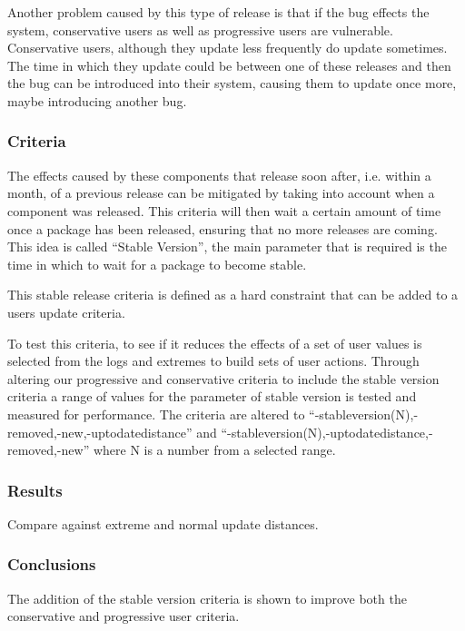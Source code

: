 Another problem caused by this type of release is that if the bug effects the system, conservative users as well as progressive users are vulnerable.
Conservative users, although they update less frequently do update sometimes.
The time in which they update could be between one of these releases and then the bug can be introduced into their system, 
causing them to update once more, maybe introducing another bug.


\subsubsection{Criteria}   
The effects caused by these components that release soon after, i.e. within a month, of a previous release can be mitigated by taking into account when a component was released.
This criteria will then wait a certain amount of time once a package has been released, ensuring that no more releases are coming.
This idea is called ``Stable Version'', the main parameter that is required is the time in which to wait for a package to become stable.

This stable release criteria is defined as a hard constraint that can be added to a users update criteria.

To test this criteria, to see if it reduces the effects of a set of user values is selected from the logs and extremes to build sets of user actions.
Through altering our progressive and conservative criteria to include the stable version criteria a range of values for the parameter of stable version is tested and measured for performance.
The criteria are altered to ``-stableversion(N),-removed,-new,-uptodatedistance'' and ``-stableversion(N),-uptodatedistance,-removed,-new'' where N is a number from a selected range.

\subsubsection{Results}
Compare against extreme and normal update distances.

\subsubsection{Conclusions}
The addition of the stable version criteria is shown to improve both the conservative and progressive user criteria.

